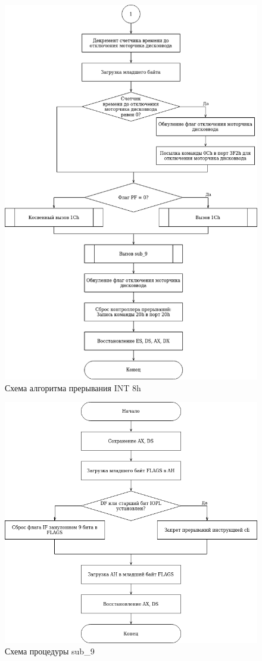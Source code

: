 \begin{figure}[h!]
	\begin{center}
		\includegraphics[scale=0.6]{assets/int8_1F.drawio.png}
		\caption{Схема алгоритма прерывания INT 8h}
	\end{center}
\end{figure}

\begin{figure}[h!]
	\begin{center}
		\includegraphics[scale=0.65]{assets/sub_9F.drawio.png}
		\caption{Схема процедуры sub\_9}
	\end{center}
\end{figure}